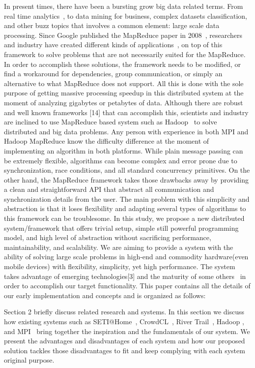 \documentclass[10pt,reprint]{socc14}
\begin{document}
In present times, there have been a bursting grow big data related terms.  From real time analytics~\cite{Chen2012}, to data mining for business, complex datasets classification, and other buzz topics that involves a common element: large scale data processing. Since Google published the MapReduce paper in 2008~\cite{Dean2008}, researchers and industry have created different kinds of applications~\cite{Chu2007,Ekanayake2008,Papadimitriou2008}, on top of this framework to solve problems that are not necessarily suited for the MapReduce. In order to accomplish these solutions, the framework needs to be modified, or find a workaround for dependencies, group communication, or simply an alternative to what MapReduce does not support. All this is done with the sole purpose of getting massive processing speedup in this distributed system at the moment of analyzing gigabytes or petabytes of data. Although there are robust and well known frameworks [14] that can accomplish this, scientists and industry are inclined to use MapReduce based system such as Hadoop~\cite{Hadoop} to solve distributed and big data problems. Any person with experience in both MPI and Hadoop MapReduce know the difficulty difference at the moment of implementing an algorithm in both platforms. While plain message passing can be extremely flexible, algorithms can become complex and error prone due to synchronization, race conditions, and all standard concurrency primitives. On the other hand, the MapReduce framework takes those drawbacks away by providing a clean and straightforward API that abstract all communication and synchronization details from the user. The main problem with this simplicity and abstraction is that it loses flexibility and adapting several types of algorithms to this framework can be troublesome. In this study, we propose a new distributed system/framework that offers trivial setup, simple still powerful programming model, and high level of abstraction without sacrificing performance, maintainability, and scalability. We are aiming to provide a system with the ability of solving large scale problems in high-end and commodity hardware(even mobile devices) with flexibility, simplicity, yet high  performance. The system takes advantage of emerging technologies[3] and the maturity of some others~\cite{Tilkov2010} in order to accomplish our target functionality. This paper contains all the details of our early implementation and concepts and is organized as follows: 

Section 2 briefly discuss related research and systems. In this section we discuss how existing systems such as SETI@Home~\cite{Korpela2001a}, CrowdCL~\cite{MacWilliam2013}, River Trail~\cite{Herhut2013a}, Hadoop \cite{Hadoop}, and MPI~\cite{GroppWilliamandLuskEwingandSkjellum1999} bring together the inspiration and the fundamentals of our system. We present the advantages and disadvantages of each system and how our proposed solution tackles those disadvantages to fit and keep complying with each system original purpose.
\end{document}
